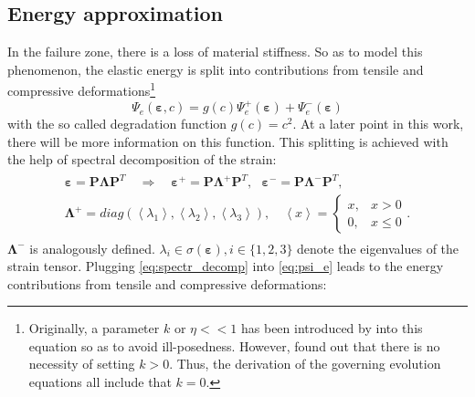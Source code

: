 \subsection{Energy approximation} \label{sec:energy_approx}
In the failure zone, there is a loss of material stiffness. So as to model this phenomenon, the elastic energy is split into contributions from tensile and compressive deformations\footnote{Originally, a parameter $k$ or $\eta<<1$ has been introduced by \citet{09_PF_k} into this equation so as to avoid ill-posedness. However, \citet{01_PF_dyn_brittle} found out that there is no necessity of setting $k>0$. Thus, the derivation of the governing evolution equations all include that $k=0$.}
\begin{equation} \label{eq:el_energy}
	\Psi_{e}\left(\bm{\varepsilon},c\right)=g\left(c\right) \Psi_{e}^{+}\left(\bm{\varepsilon}\right)+\Psi_{e}^{-}\left(\bm{\varepsilon}\right)
\end{equation}
with the so called degradation function $g\left(c\right)=c^{2}$. At a later point in this work, there will be more information on this function. This splitting is achieved with the help of spectral decomposition of the strain:
\begin{align} \label{eq:spectr_decomp}
	\begin{aligned}
		\bm{\varepsilon} = \mathbf{P}\bm{\Lambda}\mathbf{P}^{T} \quad \Rightarrow \quad \bm{\varepsilon}^{+} = \mathbf{P}\bm{\Lambda}^{+}\mathbf{P}^{T}, \text{ } \bm{\varepsilon}^{-} = \mathbf{P}\bm{\Lambda}^{-}\mathbf{P}^{T}, \\
		\bm{\Lambda}^{+}=diag\left(\left<\lambda_{1}\right>,\left<\lambda_{2}\right>,\left<\lambda_{3}\right>\right), \quad \left<x\right>=\begin{cases}x, &x>0 \\ 0, & x\leq0\end{cases}.
	\end{aligned}
\end{align}
$\bm{\Lambda}^{-}$ is analogously                                                                                                                                                                                                                                                                                                                                                                                                                                                                                                          defined. $\lambda_{i}\in\sigma\left(\bm{\varepsilon}\right),i\in\{1,2,3\}$ denote the eigenvalues of the strain tensor. Plugging \eqref{eq:spectr_decomp} into \eqref{eq:psi_e} leads to the energy contributions from tensile and compressive deformations:
